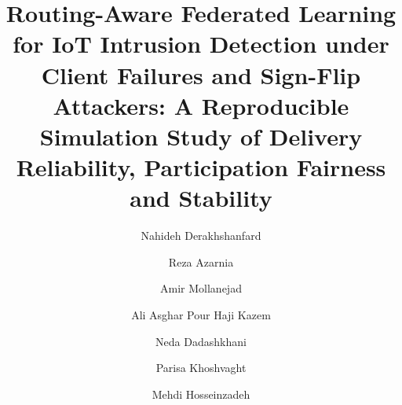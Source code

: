 \documentclass[preprint,12pt,times,numafflabel]{elsarticle}
\begin{document}
\begin{frontmatter}
\title{Routing-Aware Federated Learning for IoT Intrusion Detection under Client Failures and Sign-Flip Attackers: A Reproducible Simulation Study of Delivery Reliability, Participation Fairness and Stability}

\author[1]{Nahideh Derakhshanfard}
\author[1]{Reza Azarnia}
\author[2]{Amir Mollanejad}
\author[3]{Ali Asghar Pour Haji Kazem}
\author[4]{Neda Dadashkhani}
\author[5]{Parisa Khoshvaght}
\author[6]{Mehdi Hosseinzadeh}
\address[1]{Department of Computer Engineering, Tabriz Branch, Islamic Azad University, Tabriz, Iran}
\address[2]{Department of Computer Engineering, Aras Branch, Islamic Azad University, Jolfa, Iran}
\address[3]{Department of Software Engineering, Faculty of Engineering and Natural Sciences, Istinye University, Istanbul, Turkey}
\address[4]{Computer Programming Program, Vocational School, Istinye University, Istanbul, Turkey}
\address[5]{Institute of Research and Development, Duy Tan University, Da Nang, Vietnam}
\address[6]{School of Engineering \& Technology, Duy Tan University, Da Nang, Vietnam}


\end{frontmatter}
\end{document}
